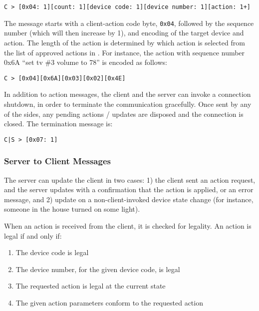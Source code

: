 \begin{verbatim}
C > [0x04: 1][count: 1][device code: 1][device number: 1][action: 1+]
\end{verbatim}

\noindent
The message starts with a client-action code byte, {\tt 0x04}, followed by the sequence number (which will then increase by 1), and encoding of the target device and action. The length of the action is determined by which action is selected from the list of approved actions in . For instance, the action with sequence number 0x6A ``set tv \#3 volume to 78'' is encoded as follows:

\begin{verbatim}
C > [0x04][0x6A][0x03][0x02][0x4E]
\end{verbatim}

\noindent
In addition to action messages, the client and the server can invoke a connection shutdown, in order to terminate the communication gracefully. Once sent by any of the sides, any pending actions / updates are disposed and the connection is closed. The termination message is:

\begin{verbatim}
C|S > [0x07: 1]
\end{verbatim}


\subsubsection{Server to Client Messages}
\label{sec:pdus:pdu:s_to_c}

The server can update the client in two cases: 1) the client sent an action request, and the server updates with a confirmation that the action is applied, or an error message, and 2) update on a non-client-invoked device state change (for instance, someone in the house turned on some light).

When an action is received from the client, it is checked for legality. An action is legal if and only if:
\begin{enumerate}
\item The device code is legal
\item The device number, for the given device code, is legal
\item The requested action is legal at the current state
\item The given action parameters conform to the requested action
\end{enumerate}

